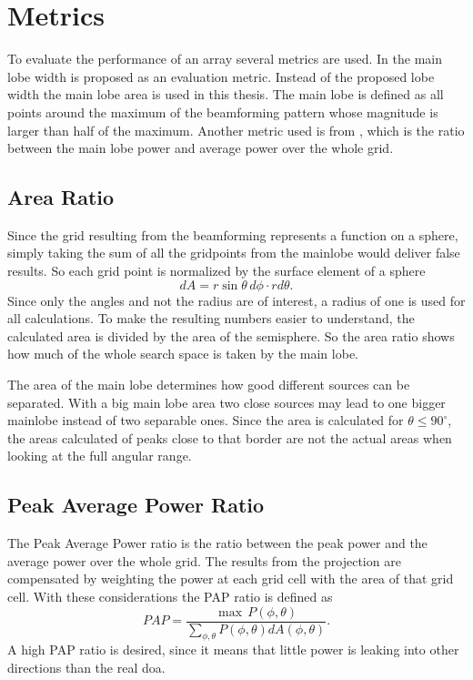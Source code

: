 \newpage
\section{Metrics}
\label{sec:metrics}
To evaluate the performance of an array several metrics are used.
In \cite{Amaral} the main lobe width is proposed as an evaluation metric.
Instead of the proposed lobe width the main lobe area is
used in this thesis.
The main lobe is defined as all points around the maximum of the
beamforming pattern whose magnitude is larger than half of the maximum.
Another metric used is from \cite{GuiAhmad}, which is the ratio
between the main lobe power and average power over the whole grid.


\subsection{Area Ratio}
Since the grid resulting from the beamforming represents a function on a sphere,
simply taking the sum of all the gridpoints from the mainlobe
would deliver false results.
So each grid point is normalized by the surface element of a sphere
\begin{equation}
	dA = r \sin\theta \, d\phi \cdot r d\theta.
\end{equation}
Since only the angles and not the radius are of interest, a radius of one is used for all
calculations.
To make the resulting numbers easier to understand, the calculated area is divided
by the area of the semisphere.
So the area ratio shows how much of the whole search space is taken by the main lobe.

The area of the main lobe determines how good different sources can be separated.
With a big main lobe area two close sources may lead to one bigger mainlobe instead
of two separable ones.
Since the area is calculated for $\theta \leq 90^\circ$, the areas calculated
of peaks close to that border are not the actual areas when looking at the
full angular range.


\subsection{Peak Average Power Ratio}
The Peak Average Power ratio is the ratio between the peak power and
the average power over the whole grid.
The results from the projection are compensated by weighting
the power at each grid cell with the area of that grid cell.
With these considerations the PAP ratio is defined as
\begin{equation}
	PAP = \frac{\max \, P(\phi, \theta)}{\sum_{\phi, \theta}^{} P(\phi, \theta) dA(\phi, \theta)}.
\end{equation}
A high PAP ratio is desired, since it means that little power is leaking
into other directions than the real \acrshort{doa}.


